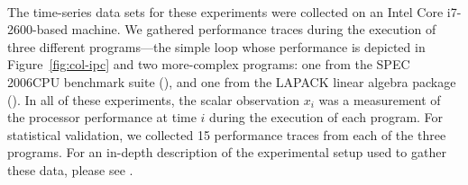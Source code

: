 The time-series data sets for these experiments were collected on an
Intel Core\textsuperscript{\textregistered} i7-2600-based machine.
% 
% 
We gathered performance traces during the execution of three different
programs---the simple \col loop whose performance is depicted in
Figure~\ref{fig:col-ipc} and two more-complex programs: one from the
SPEC 2006CPU benchmark suite (\gcc), and one from the LAPACK linear
algebra package (\svd).  In all of these experiments, the scalar
observation $x_i$ was a measurement of the processor performance at
time $i$ during the execution of each program.
% 
% 
% 
For statistical validation, we collected 15 performance traces from
each of the three programs.  For an in-depth description of the
experimental setup used to gather these data,
please see \cite{zach-IDA10,mytkowicz09,todd-phd}.  





